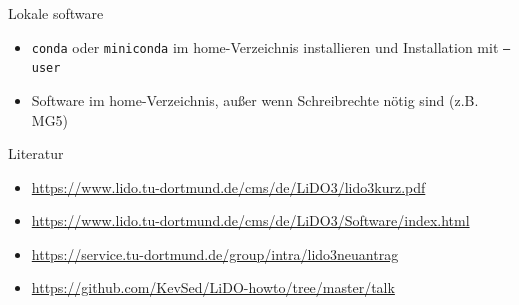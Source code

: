\begin{frame}{Lokale software}
  \begin{itemize}
    \item \texttt{conda} oder \texttt{miniconda} im home-Verzeichnis installieren und Installation mit \texttt{--user}
    \item Software im home-Verzeichnis, außer wenn Schreibrechte nötig sind (z.B. MG5)
  \end{itemize}

\end{frame}

\begin{frame}{Literatur}
  \begin{itemize}
    \item \url{https://www.lido.tu-dortmund.de/cms/de/LiDO3/lido3kurz.pdf}
    \item \url{https://www.lido.tu-dortmund.de/cms/de/LiDO3/Software/index.html}
    \item \url{https://service.tu-dortmund.de/group/intra/lido3neuantrag}
    \item \url{https://github.com/KevSed/LiDO-howto/tree/master/talk}
  \end{itemize}
\end{frame}



